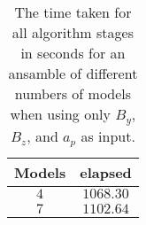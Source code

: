 \begin{table}[!ht]
	\centering
	\begin{tabular}{|c|c|}
		\hline
		Models & elapsed \\ \hline
		$4$ & $1068.30$ \\ \hline
		$7$ & $1102.64$ \\ \hline
	\end{tabular}
	\caption{The time taken for all algorithm stages in seconds for an ansamble of different numbers of models when using only $B_{y}$, $B_{z}$, and $a_{p}$ as input.}
	\label{tab:time:ansamble:yzap}
\end{table}
